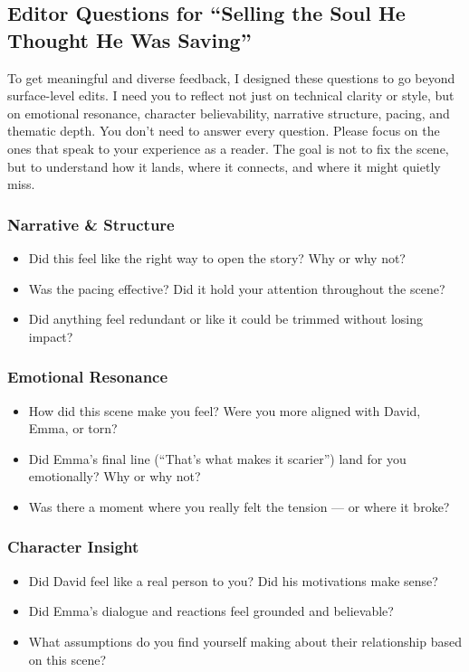 \subsection*{Editor Questions for ``Selling the Soul He Thought He Was Saving''}

To get meaningful and diverse feedback, I designed these questions to go beyond surface-level edits. 
I need you to reflect not just on technical clarity or style, but on emotional resonance, character 
believability, narrative structure, pacing, and thematic depth. You don’t need to answer every question. 
Please focus on the ones that speak to your experience as a reader. The goal is not to fix the scene, but 
to understand how it lands, where it connects, and where it might quietly miss.


\subsubsection{Narrative \& Structure}

\begin{itemize}
  \item Did this feel like the right way to open the story? Why or why not?
  \item Was the pacing effective? Did it hold your attention throughout the scene?
  \item Did anything feel redundant or like it could be trimmed without losing impact?
\end{itemize}

\subsubsection{Emotional Resonance}

\begin{itemize}
  \item How did this scene make you feel? Were you more aligned with David, Emma, or torn?
  \item Did Emma’s final line (“That’s what makes it scarier”) land for you emotionally? Why or why not?
  \item Was there a moment where you really felt the tension — or where it broke?
\end{itemize}

\subsubsection{Character Insight}

\begin{itemize}
  \item Did David feel like a real person to you? Did his motivations make sense?
  \item Did Emma’s dialogue and reactions feel grounded and believable?
  \item What assumptions do you find yourself making about their relationship based on this scene?
\end{itemize}

